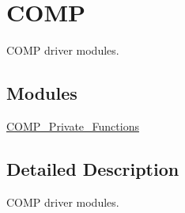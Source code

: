\hypertarget{group___c_o_m_p}{\section{C\-O\-M\-P}
\label{group___c_o_m_p}
}


C\-O\-M\-P driver modules.  


\subsection*{Modules}
\begin{DoxyCompactItemize}
\item 
\hyperlink{group___c_o_m_p___private___functions}{C\-O\-M\-P\-\_\-\-Private\-\_\-\-Functions}
\end{DoxyCompactItemize}


\subsection{Detailed Description}
C\-O\-M\-P driver modules. 